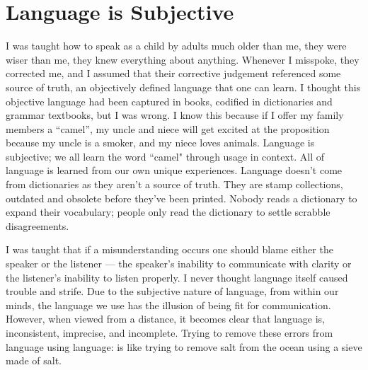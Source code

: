 \section{Language is Subjective}

I was taught how to speak as a child by adults much older than me, they were wiser than me, they knew everything about anything. Whenever I misspoke, they corrected me, and I assumed that their corrective judgement referenced some source of truth, an objectively defined language that one can learn. I thought this objective language had been captured in books, codified in dictionaries and grammar textbooks, but I was wrong. I know this because if I offer my family members a ``camel'', my uncle and niece will get excited at the proposition because my uncle is a smoker, and my niece loves animals. Language is subjective; we all learn the word ``camel" through usage in context. All of language is learned from our own unique experiences. Language doesn't come from dictionaries as they aren't a source of truth. They are stamp collections, outdated and obsolete before they've been printed. Nobody reads a dictionary to expand their vocabulary; people only read the dictionary to settle scrabble disagreements.









I was taught that if a misunderstanding occurs one should blame either the speaker or the listener — the speaker's inability to communicate with clarity or the listener's inability to listen properly. I never thought language itself caused trouble and strife. Due to the subjective nature of language, from within our minds, the language we use has the illusion of being fit for communication. However, when viewed from a distance, it becomes clear that language is, inconsistent, imprecise, and incomplete. Trying to remove these errors from language using language: is like trying to remove salt from the ocean using a sieve made of salt.


